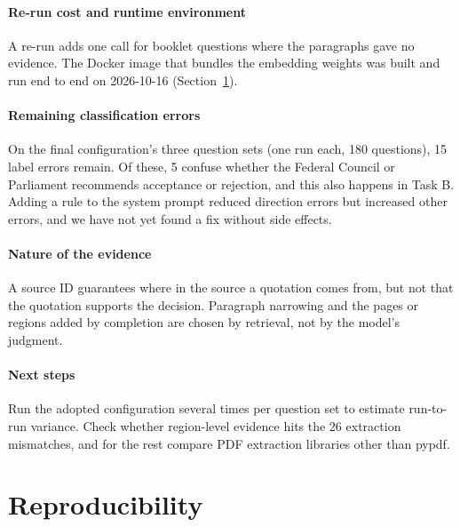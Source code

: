 \documentclass[10pt,a4paper]{article}
\begin{document}
\paragraph{Re-run cost and runtime environment}
A re-run adds one call for booklet questions where the paragraphs gave no evidence.
The Docker image that bundles the embedding weights was built and run end to end on 2026-10-16 (Section~\ref{sec:repro}).

\paragraph{Remaining classification errors}
On the final configuration's three question sets (one run each, 180 questions), 15 label errors remain.
Of these, 5 confuse whether the Federal Council or Parliament recommends acceptance or rejection, and this also happens in Task B.
Adding a rule to the system prompt reduced direction errors but increased other errors, and we have not yet found a fix without side effects.

\paragraph{Nature of the evidence}
A source ID guarantees where in the source a quotation comes from, but not that the quotation supports the decision\cite{gao2023alce}.
Paragraph narrowing and the pages or regions added by completion are chosen by retrieval, not by the model's judgment.

\paragraph{Next steps}
Run the adopted configuration several times per question set to estimate run-to-run variance.
Check whether region-level evidence hits the 26 extraction mismatches, and for the rest compare PDF extraction libraries other than pypdf.

\section{Reproducibility}
\label{sec:repro}
\end{document}

